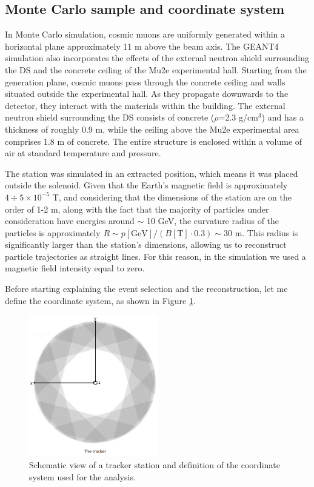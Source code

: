 \subsection{Monte Carlo sample and coordinate system }\label{genplane}
In Monte Carlo simulation, cosmic muons are uniformly generated within a horizontal plane approximately 11 m 
above the beam axis. The GEANT4 simulation also incorporates the effects of the external neutron shield surrounding the DS 
and the concrete ceiling of the Mu2e experimental hall. Starting from the generation plane, 
cosmic muons pass through the concrete ceiling and walls situated outside the experimental hall. 
As they propagate downwards to the detector, they interact with the materials within the building. 
The external neutron shield surrounding the DS consists of concrete ($\rho$=2.3 g/cm$^3$) and has a thickness of 
roughly 0.9 m, while the ceiling above the Mu2e experimental area comprises 1.8 m of concrete. 
The entire structure is enclosed within a volume of air at standard temperature and pressure.

The station was simulated in an extracted position, 
which means it was placed outside the solenoid. 
Given that the Earth's magnetic field is approximately 
$4 \div 5 \times 10^{-5}$ T, 
and considering that the dimensions of the station are 
on the order of 1-2 m, 
along with the fact that the majority of particles 
under consideration have energies around $\sim$ 10 GeV, 
the curvature radius of the particles is approximately 
$R\sim p[\text{GeV}]/(B[\text{T}]\cdot 0.3) \sim 30$ m. 
This radius is significantly larger than the station's 
dimensions, allowing us to reconstruct particle trajectories 
as straight lines.
For this reason, in the simulation we used a 
magnetic field intensity equal to zero. 

Before starting explaining the event selection and the 
reconstruction, let me define the coordinate system, 
as shown in Figure \ref{fig:coordinate}.
\begin{figure}[!h]
    \centering
    \includegraphics[width =0.5\textwidth]{figures/png/Screenshot_20240526_164527.png}
    \caption[Schematic view of a tracker station and the coordinate system.]{Schematic view of a tracker station and definition of the coordinate system used for the analysis.}
    \label{fig:coordinate}
\end{figure}
